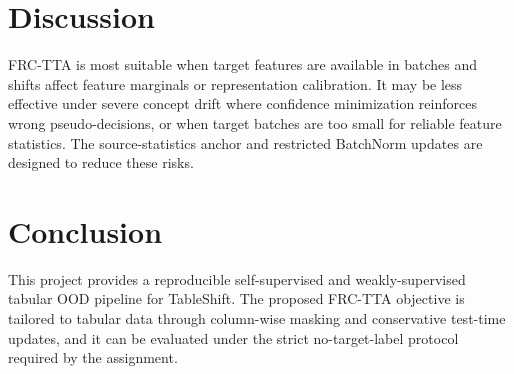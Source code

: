 \IfFileExists{neurips_2025.sty}{\documentclass{article}\usepackage[preprint]{neurips_2025}}{\documentclass[11pt]{article}\usepackage[margin=1in]{geometry}}
\begin{document}
\section{Discussion}
FRC-TTA is most suitable when target features are available in batches and shifts affect feature marginals or representation calibration. It may be less effective under severe concept drift where confidence minimization reinforces wrong pseudo-decisions, or when target batches are too small for reliable feature statistics. The source-statistics anchor and restricted BatchNorm updates are designed to reduce these risks.

\section{Conclusion}
This project provides a reproducible self-supervised and weakly-supervised tabular OOD pipeline for TableShift. The proposed FRC-TTA objective is tailored to tabular data through column-wise masking and conservative test-time updates, and it can be evaluated under the strict no-target-label protocol required by the assignment.



\end{document}
